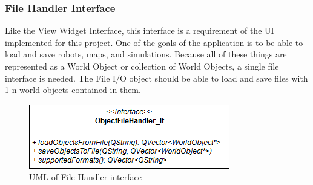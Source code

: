   \subsubsection*{File Handler Interface}
  Like the View Widget Interface, this interface is a requirement of the UI implemented for this project. One of the goals of the application is to be able to load and save robots, maps, and simulations. Because all of these things are represented as a World Object or collection of World Objects, a single file interface is needed. The File I/O object should be able to load and save files with 1-n world objects contained in them.
   \begin{figure}
 	\begin{center}
 	\includegraphics[scale=0.5]{./images_design/uml/FileHandler_If}
 	\caption{UML of File Handler interface\label{uml:filehandle_if}}
 	\end{center}
 \end{figure}
